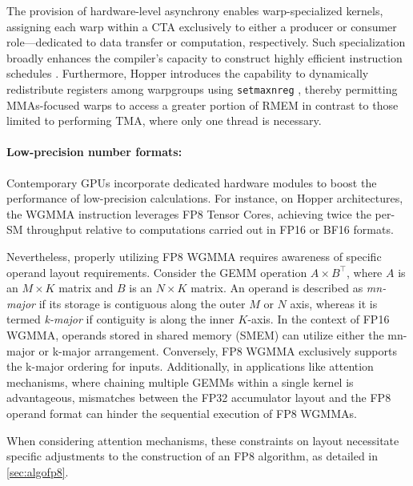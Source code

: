 The provision of hardware-level asynchrony enables warp-specialized kernels, assigning each warp within a CTA exclusively to either a producer or consumer role—dedicated to data transfer or computation, respectively. Such specialization broadly enhances the compiler’s capacity to construct highly efficient instruction schedules \citep{warp-specialization-2011}. Furthermore, Hopper introduces the capability to dynamically redistribute registers among warpgroups using \verb|setmaxnreg| \cite[\S9.7.17.1]{ptx}, thereby permitting MMAs-focused warps to access a greater portion of RMEM in contrast to those limited to performing TMA, where only one thread is necessary.

\paragraph{Low-precision number formats:}
\label{sec:low-precision-gpu}
Contemporary GPUs incorporate dedicated hardware modules to boost the performance of low-precision calculations. For instance, on Hopper architectures, the WGMMA instruction leverages FP8 Tensor Cores, achieving twice the per-SM throughput relative to computations carried out in FP16 or BF16 formats.

Nevertheless, properly utilizing FP8 WGMMA requires awareness of specific operand layout requirements. Consider the GEMM operation $A \times B^{\top}$, where $A$ is an $M\times K$ matrix and $B$ is an $N\times K$ matrix. An operand is described as \emph{mn-major} if its storage is contiguous along the outer $M$ or $N$ axis, whereas it is termed \emph{k-major} if contiguity is along the inner $K$-axis. In the context of FP16 WGMMA, operands stored in shared memory (SMEM) can utilize either the mn-major or k-major arrangement. Conversely, FP8 WGMMA exclusively supports the k-major ordering for inputs. Additionally, in applications like attention mechanisms, where chaining multiple GEMMs within a single kernel is advantageous, mismatches between the FP32 accumulator layout and the FP8 operand format can hinder the sequential execution of FP8 WGMMAs.

When considering attention mechanisms, these constraints on layout necessitate specific adjustments to the construction of an FP8 algorithm, as detailed in \cref{sec:algofp8}.

